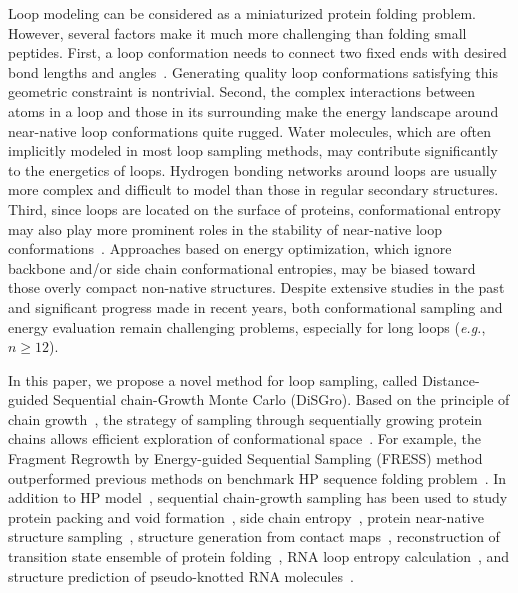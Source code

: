 Loop modeling can be considered as a miniaturized protein folding
problem. However, several factors make it much more challenging than
folding small peptides. First, a loop conformation needs to connect
two fixed ends with desired bond lengths and
angles~\cite{canutescu2003,coutsias2004}. Generating quality loop
conformations satisfying this geometric constraint is nontrivial.
Second, the complex interactions between atoms in a loop and those
in its surrounding make the energy landscape around near-native loop
conformations quite rugged. Water molecules, which are often
implicitly modeled in most loop sampling methods, may contribute
significantly to the energetics of loops. Hydrogen bonding networks
around loops are usually more complex and difficult to model than
those in regular secondary structures. Third, since loops are
located on the surface of proteins, conformational entropy may also
play more prominent roles in the stability of near-native loop
conformations~\cite{zhang2006a,zhang2007b}. Approaches based on
energy optimization, which ignore backbone and/or side chain
conformational entropies, may be biased toward those overly compact
non-native structures. Despite extensive studies in the past and
significant progress made in recent years, both conformational
sampling and energy evaluation remain challenging problems,
especially for long loops ({\it e.g.}, $n \ge 12$).

In this paper, we propose a novel method for loop sampling, called
Distance-guided Sequential chain-Growth Monte Carlo ({\sc DiSGro}).
Based on the principle of chain
growth~\cite{rosenbluth1955,grassberger1997,liu1998,liang2002,zhang2007a},
the strategy of sampling through sequentially growing protein chains
allows efficient exploration of conformational
space~\cite{liu1998,liang2002,zhang2007a,liu2008,zhang2008}. For
example, the Fragment Regrowth by Energy-guided Sequential Sampling
(FRESS) method outperformed previous methods on benchmark HP
sequence folding problem~\cite{zhang2007a,wong2013}. In addition to
HP model~\cite{zhang2007a}, sequential chain-growth sampling has
been used to study protein packing and void
formation~\cite{liang2002}, side chain
entropy~\cite{zhang2004a,zhang2006a}, protein near-native structure
sampling~\cite{zhang2007b}, structure generation from contact
maps~\cite{lin2008}, reconstruction of transition state ensemble of
protein folding~\cite{lin2011}, RNA loop entropy
calculation~\cite{zhang2008}, and structure prediction of
pseudo-knotted RNA molecules~\cite{zhang2009}.

